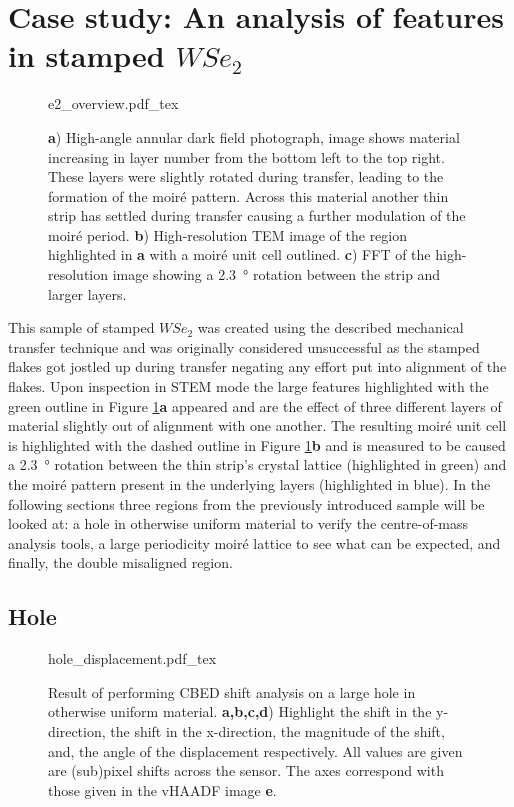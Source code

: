 \section{Case study: An analysis of features in stamped $WSe_2$}
\begin{figure}
    \centering
    \def\svgwidth{.95\linewidth}
    {e2_overview.pdf_tex}
    \caption{\textbf{a}) High-angle annular dark field photograph, image shows material increasing in layer number from the bottom left to the top right. These layers were slightly rotated during transfer, leading to the formation of the moiré pattern. Across this material another thin strip has settled during transfer causing a further modulation of the moiré period. \textbf{b}) High-resolution TEM image of the region highlighted in \textbf{a} with a moiré unit cell outlined. \textbf{c}) FFT of the high-resolution image showing a \SI{2.3}{\degree} rotation between the strip and larger layers.}
    \label{fig:dub_moire}
\end{figure}

This sample of stamped $WSe_2$ was created using the described mechanical transfer technique and was originally considered unsuccessful as the stamped flakes got jostled up during transfer negating any effort put into alignment of the flakes. Upon inspection in STEM mode the large features highlighted with the green outline in Figure \ref{fig:dub_moire}\textbf{a} appeared and are the effect of three different layers of material slightly out of alignment with one another. The resulting moiré unit cell is highlighted with the dashed outline in Figure \ref{fig:dub_moire}\textbf{b} and is measured to be caused a \SI{2.3}{\degree} rotation between the thin strip's crystal lattice (highlighted in green) and the moiré pattern present in the underlying layers (highlighted in blue).
In the following sections three regions from the previously introduced sample will be looked at: a hole in otherwise uniform material to verify the centre-of-mass analysis tools, a large periodicity moiré lattice to see what can be expected, and finally, the double misaligned region.

\subsection{Hole}

\begin{figure}
    \centering
    \def\svgwidth{.95\linewidth}
    {hole_displacement.pdf_tex}
    \caption{Result of performing CBED shift analysis on a large hole in otherwise uniform material. \textbf{a,b,c,d}) Highlight the shift in the y-direction, the shift in the x-direction, the magnitude of the shift, and, the angle of the displacement respectively. All values are given are (sub)pixel shifts across the sensor. The axes correspond with those given in the vHAADF image \textbf{e}.}
    \label{fig:hole_dis}
\end{figure}

